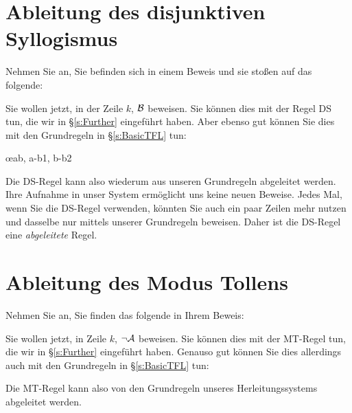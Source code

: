 \section{Ableitung des disjunktiven Syllogismus}
Nehmen Sie an, Sie befinden sich in einem Beweis und sie sto{\ss}en auf das folgende:
\begin{fitchproof}
\end{fitchproof}
Sie wollen jetzt, in der Zeile $k$, $\mathcal{B}$ beweisen. Sie können dies mit der Regel DS tun, die wir in \S\ref{s:Further} eingeführt haben. Aber ebenso gut können Sie dies mit den Grundregeln in \S\ref{s:BasicTFL} tun:
	\begin{fitchproof}
		\open
		\close
		\open
		\close
	\oe{ab, a-b1, b-b2}
\end{fitchproof}
Die DS-Regel kann also wiederum aus unseren Grundregeln abgeleitet werden. Ihre Aufnahme in unser System ermöglicht uns keine neuen Beweise. Jedes Mal, wenn Sie die DS-Regel verwenden, könnten Sie auch ein paar Zeilen mehr nutzen und dasselbe nur mittels unserer Grundregeln beweisen. Daher ist die DS-Regel eine \emph{abgeleitete} Regel.

\section{Ableitung des Modus Tollens}
Nehmen Sie an, Sie finden das folgende in Ihrem Beweis:
\begin{fitchproof}
\end{fitchproof}
Sie wollen jetzt, in Zeile $k$, $\neg \mathcal{A}$ beweisen. Sie können dies mit der MT-Regel tun, die wir in \S\ref{s:Further} eingeführt haben. Genauso gut können Sie dies allerdings auch mit den Grundregeln in \S\ref{s:BasicTFL} tun:
\begin{fitchproof}
		\open
		\close
\end{fitchproof}
Die MT-Regel kann also von den Grundregeln unseres Herleitungssystems abgeleitet werden.

